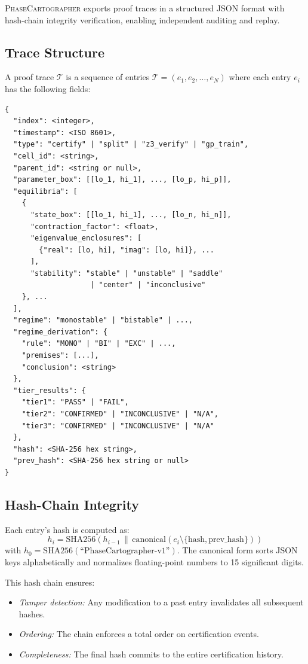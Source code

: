 \documentclass[11pt]{article}
\newcommand{\PC}{\textsc{PhaseCartographer}}
\begin{document}
\PC{} exports proof traces in a structured JSON format with hash-chain integrity verification, enabling independent auditing and replay.

\subsection{Trace Structure}

A proof trace $\mathcal{T}$ is a sequence of entries $\mathcal{T} = (e_1, e_2, \ldots, e_N)$ where each entry $e_i$ has the following fields:

\begin{verbatim}
{
  "index": <integer>,
  "timestamp": <ISO 8601>,
  "type": "certify" | "split" | "z3_verify" | "gp_train",
  "cell_id": <string>,
  "parent_id": <string or null>,
  "parameter_box": [[lo_1, hi_1], ..., [lo_p, hi_p]],
  "equilibria": [
    {
      "state_box": [[lo_1, hi_1], ..., [lo_n, hi_n]],
      "contraction_factor": <float>,
      "eigenvalue_enclosures": [
        {"real": [lo, hi], "imag": [lo, hi]}, ...
      ],
      "stability": "stable" | "unstable" | "saddle"
                    | "center" | "inconclusive"
    }, ...
  ],
  "regime": "monostable" | "bistable" | ...,
  "regime_derivation": {
    "rule": "MONO" | "BI" | "EXC" | ...,
    "premises": [...],
    "conclusion": <string>
  },
  "tier_results": {
    "tier1": "PASS" | "FAIL",
    "tier2": "CONFIRMED" | "INCONCLUSIVE" | "N/A",
    "tier3": "CONFIRMED" | "INCONCLUSIVE" | "N/A"
  },
  "hash": <SHA-256 hex string>,
  "prev_hash": <SHA-256 hex string or null>
}
\end{verbatim}

\subsection{Hash-Chain Integrity}

Each entry's hash is computed as:
\[
h_i = \mathrm{SHA256}(h_{i-1} \,\|\, \mathrm{canonical}(e_i \setminus \{\text{hash}, \text{prev\_hash}\}))
\]
with $h_0 = \mathrm{SHA256}(\text{``PhaseCartographer-v1''})$.
The canonical form sorts JSON keys alphabetically and normalizes floating-point numbers to 15 significant digits.

This hash chain ensures:
\begin{itemize}
\item \emph{Tamper detection:} Any modification to a past entry invalidates all subsequent hashes.
\item \emph{Ordering:} The chain enforces a total order on certification events.
\item \emph{Completeness:} The final hash commits to the entire certification history.
\end{itemize}
\end{document}
